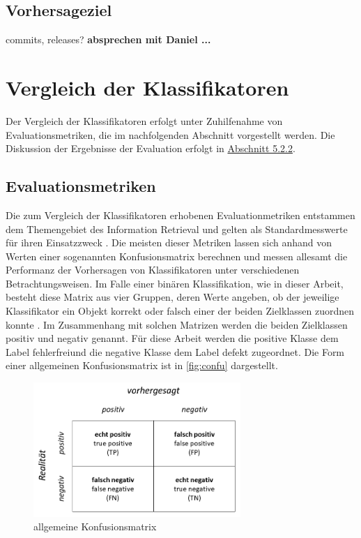 \subsection*{Vorhersageziel}
commits, releases?
\textbf{absprechen mit Daniel ...}

\section{Vergleich der Klassifikatoren}

Der Vergleich der Klassifikatoren erfolgt unter Zuhilfenahme von Evaluationsmetriken, die im nachfolgenden Abschnitt vorgestellt werden. Die Diskussion der Ergebnisse der Evaluation erfolgt in \hyperref[results]{Abschnitt 5.2.2}.

\subsection{Evaluationsmetriken}
\label{eval-metrics}

Die zum Vergleich der Klassifikatoren erhobenen Evaluationmetriken entstammen dem Themengebiet des Information Retrieval und gelten als Standardmesswerte für ihren Einsatzzweck \cite{Sammut2017}. Die meisten dieser Metriken lassen sich anhand von Werten einer sogenannten Konfusionsmatrix berechnen und messen allesamt die Performanz der Vorhersagen von Klassifikatoren unter verschiedenen Betrachtungsweisen. Im Falle einer binären Klassifikation, wie in dieser Arbeit, besteht diese Matrix aus vier Gruppen, deren Werte angeben, ob der jeweilige Klassifikator ein Objekt korrekt oder falsch einer der beiden Zielklassen zuordnen konnte \cite{Sammut2017}. Im Zusammenhang mit solchen Matrizen werden die beiden Zielklassen \glqq positiv\grqq{} und \glqq negativ\grqq{} genannt. Für diese Arbeit werden die positive Klasse dem Label \glqq fehlerfrei\grqq und die negative Klasse dem Label \glqq defekt\grqq{} zugeordnet. Die Form einer allgemeinen Konfusionsmatrix ist in \autoref{fig:confu} dargestellt.

\begin{figure}[H]
    \centering
    \includegraphics[width=0.7\textwidth]{images/Confusion}
    \caption{allgemeine Konfusionsmatrix\label{fig:confu}}
\end{figure}

